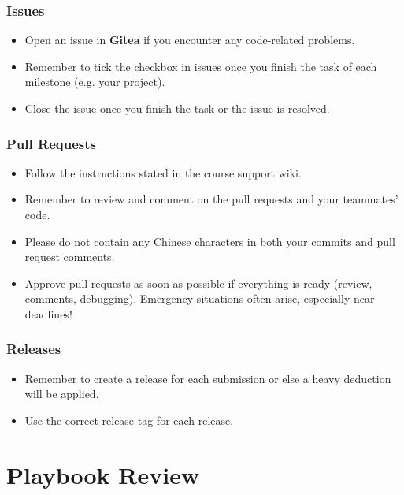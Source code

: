 \documentclass[
	11pt, %
]{beamer}
\begin{document}
\begin{frame}
	\frametitle{Issues}
 
	\begin{itemize}
    \item Open an issue in \textbf{Gitea} if you encounter any code-related problems.
    \item Remember to tick the checkbox in issues once you finish the task of each milestone (e.g. your project).
    \item Close the issue once you finish the task or the issue is resolved.
\end{itemize}

\end{frame}



\begin{frame}
	\frametitle{Pull Requests}
 
	\begin{itemize}
    \item Follow the instructions stated in the course support wiki.
    \item Remember to review and comment on the pull requests and your teammates' code.
    \item Please do not contain any Chinese characters in both your commits and pull request comments.
    \item Approve pull requests as soon as possible if everything is ready (review, comments, debugging). Emergency situations often arise, especially near deadlines!
\end{itemize}

\end{frame}



\begin{frame}
	\frametitle{Releases}
 
	\begin{itemize}
    \item Remember to create a release for each submission or else a heavy deduction will be applied.
    \item Use the correct release tag for each release.
\end{itemize}

\end{frame}


\section{Playbook Review}
\end{document}
